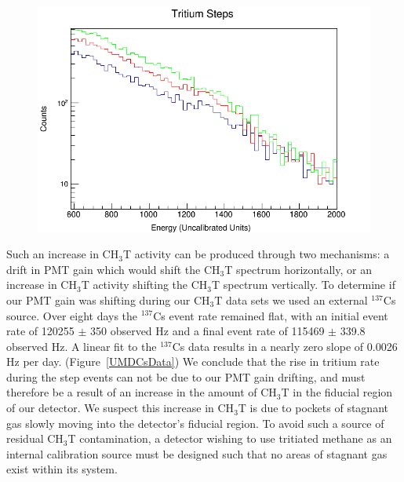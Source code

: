 \begin{figure}
\includegraphics[scale=.35]{Steps_Overlay.png} 
\label{UMDOutgassingSpectra}
\end{figure}

Such an increase in CH$_3$T activity can be produced through two mechanisms: a drift in PMT gain which would shift the CH$_3$T spectrum horizontally, or an increase in CH$_3$T activity shifting the CH$_3$T spectrum vertically. To determine if our PMT gain was shifting during our CH$_3$T data sets we used an external $^{137}$Cs source. Over eight days the $^{137}$Cs event rate remained flat, with an initial event rate of 120255 $\pm$ 350 observed Hz and a final event rate of 115469 $\pm$ 339.8 observed Hz. A linear fit to the $^{137}$Cs data results in a nearly zero slope of 0.0026 Hz per day. (Figure~\ref{UMDCsData}) We conclude that the rise in tritium rate during the step events can not be due to our PMT gain drifting, and must therefore be a result of an increase in the amount of CH$_3$T in the fiducial region of our detector. We suspect this increase in CH$_3$T is due to pockets of stagnant gas slowly moving into the detector's fiducial region. To avoid such a source of residual CH$_3$T contamination, a detector wishing to use tritiated methane as an internal calibration source must be designed such that no areas of stagnant gas exist within its system.  

